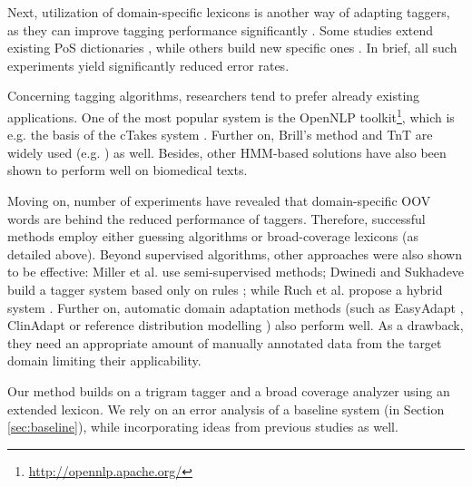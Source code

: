 Next, utilization of domain-specific lexicons is another way of adapting taggers, as they can improve tagging performance significantly \cite{coden2005domain,ruch2000minimal}. 
Some studies extend existing PoS dictionaries \cite{divita2006dtagger}, while others build new specific ones \cite{Smith2006}. 
In brief, all such experiments yield significantly reduced error rates. 

Concerning tagging algorithms, researchers tend to prefer already existing applications. 
One of the most popular system is the OpenNLP toolkit\footnote{\url{http://opennlp.apache.org/}}, which is e.g. the basis of the cTakes system \cite{savova2010mayo}.
Further on, Brill’s method \cite{Brill1992} and TnT \cite{Brants2000} are widely used (e.g. \cite{hahn2004tagging,savova2010mayo,pestian2004development}) as well. 
Besides, other HMM-based solutions have also been shown to perform well \cite{barrett2011token,coden2005domain,divita2006dtagger,hahn2004tagging,pakhomov2006developing,rost2008lessons,ruch2000minimal} on biomedical texts. 

Moving on, number of experiments have revealed \cite{ferraro2013improving,ruch2000minimal,Smith2006} that domain-specific OOV words are behind the reduced performance of taggers. 
Therefore, successful methods employ either guessing algorithms \cite{barrett2011token,divita2006dtagger,rost2008lessons,ruch2000minimal,Smith2006} or broad-coverage lexicons (as detailed above). 
Beyond supervised algorithms, other approaches were also shown to be effective: Miller et al. \cite{miller2007building} use semi-supervised methods;
Dwinedi and Sukhadeve build a tagger system based only on rules \cite{dwivedi8rule}; while Ruch et al. propose a hybrid system \cite{ruch2000minimal}. 
Further on, automatic domain adaptation methods (such as EasyAdapt \cite{daume2007frustratingly}, ClinAdapt \cite{ferraro2013improving} 
or reference distribution modelling  \cite{tateisi2006subdomain}) also perform well. As a drawback, they need an appropriate amount of manually annotated data from the target domain limiting their applicability. 

Our method builds on a trigram tagger and a broad coverage analyzer using an extended lexicon. 
We rely on an error analysis of a baseline system (in Section \ref{sec:baseline}), while  incorporating ideas from previous studies as well.

